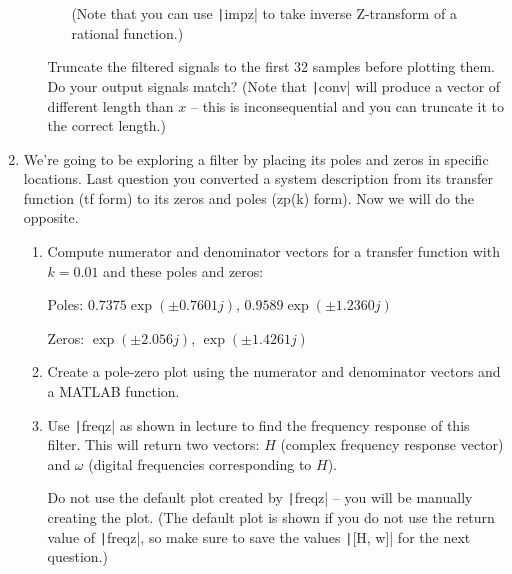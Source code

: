 \documentclass{article}
\begin{document}
\begin{enumerate}
\begin{enumerate}
\begin{enumerate}
      (Note that you can use \texttt|impz| to take inverse Z-transform of a rational function.)
    \end{enumerate}
    Truncate the filtered signals to the first 32 samples before plotting them. Do your output signals match? (Note that \texttt|conv| will produce a vector of different length than $x$ -- this is inconsequential and you can truncate it to the correct length.)
  \end{enumerate}

\item We're going to be exploring a filter by placing its poles and zeros in specific locations. Last question you converted a system description from its transfer function (tf form) to its zeros and poles (zp(k) form). Now we will do the opposite.
  \begin{enumerate}
  \item Compute numerator and denominator vectors for a transfer function with $k=0.01$ and these poles and zeros:

    Poles: $0.7375\exp(\pm0.7601j)$, $0.9589\exp(\pm1.2360j)$

    Zeros: $\exp(\pm2.056j)$, $\exp(\pm1.4261j)$

  \item Create a pole-zero plot using the numerator and denominator vectors and a MATLAB function.

  \item Use \texttt|freqz| as shown in lecture to find the frequency response of this filter. This will return two vectors: $H$ (complex frequency response vector) and $\omega$ (digital frequencies corresponding to $H$).

    Do not use the default plot created by \texttt|freqz| -- you will be manually creating the plot. (The default plot is shown if you do not use the return value of \texttt|freqz|, so make sure to save the values \texttt|[H, w]| for the next question.)


\end{enumerate}
\end{enumerate}
\end{document}
